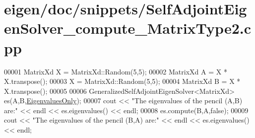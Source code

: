 \hypertarget{eigen_2doc_2snippets_2_self_adjoint_eigen_solver__compute___matrix_type2_8cpp_source}{}\section{eigen/doc/snippets/\+Self\+Adjoint\+Eigen\+Solver\+\_\+compute\+\_\+\+Matrix\+Type2.cpp}
\label{eigen_2doc_2snippets_2_self_adjoint_eigen_solver__compute___matrix_type2_8cpp_source}

\begin{DoxyCode}
00001 MatrixXd X = MatrixXd::Random(5,5);
00002 MatrixXd A = X * X.transpose();
00003 X = MatrixXd::Random(5,5);
00004 MatrixXd B = X * X.transpose();
00005 
00006 GeneralizedSelfAdjointEigenSolver<MatrixXd> es(A,B,\hyperlink{group__enums_ggae3e239fb70022eb8747994cf5d68b4a9ad0c82cf0a9daf2a63bb6e2f10d51f69c}{EigenvaluesOnly});
00007 cout << \textcolor{stringliteral}{"The eigenvalues of the pencil (A,B) are:"} << endl << es.eigenvalues() << endl;
00008 es.compute(B,A,\textcolor{keyword}{false});
00009 cout << \textcolor{stringliteral}{"The eigenvalues of the pencil (B,A) are:"} << endl << es.eigenvalues() << endl;
\end{DoxyCode}
